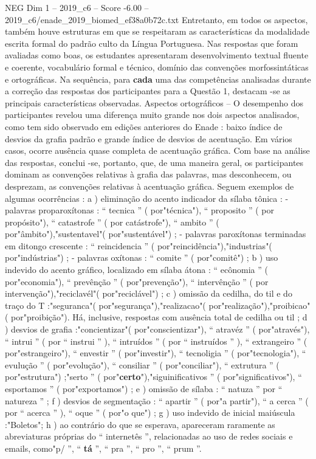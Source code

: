 \begin{textsample}{NEG Dim 1 – 2019\_c6 – Score -6.00 – 2019\_c6/enade\_2019\_biomed\_ef38a0b72c.txt}
Entretanto, em todos os aspectos, também houve estruturas em que se respeitaram as características da modalidade escrita formal do padrão culto da Língua Portuguesa.
Nas respostas que foram avaliadas como boas, os estudantes apresentaram desenvolvimento textual fluente e coerente, vocabulário formal e técnico, domínio das convenções morfossintáticas e ortográficas.
Na sequência, para \textbf{cada} uma das competências analisadas durante a correção das respostas dos participantes para a Questão 1, destacam -se as principais características observadas.
Aspectos ortográficos – O desempenho dos participantes revelou uma diferença muito grande nos dois aspectos analisados, como tem sido observado em edições anteriores do Enade : baixo índice de desvios da grafia padrão e grande índice de desvios de acentuação.
Em vários casos, ocorre ausência quase completa de acentuação gráfica.
Com base na análise das respostas, conclui -se, portanto, que, de uma maneira geral, os participantes dominam as convenções relativas à grafia das palavras, mas desconhecem, ou desprezam, as convenções relativas à acentuação gráfica.
Seguem exemplos de algumas ocorrências : a ) eliminação do acento indicador da sílaba tônica : - palavras proparoxítonas : “ tecnica ” ( por"técnica"), “ proposito ” ( por propósito"), “ catastrofe ” ( por catástrofe"), “ ambito ” ( por"âmbito"),"sustentavel"( por"sustentável") ; - palavras paroxítonas terminadas em ditongo crescente : “ reincidencia ” ( por"reincidência"),"industrias"( por"indústrias") ; - palavras oxítonas : “ comite ” ( por"comitê") ; b ) uso indevido do acento gráfico, localizado em sílaba átona : “ ecônomia ” ( por"economia"), “ prevênção ” ( por"prevenção"), “ intervênção ” ( por intervenção"),"reciclavél"( por"reciclável") ; c ) omissão da cedilha, do til e do traço do T :"seguranca"( por"segurança"),"realizacao"( por"realização"),"proibicao"( por"proibição").
Há, inclusive, respostas com ausência total de cedilha ou til ; d ) desvios de grafia :"concientizar"( por"conscientizar"), “ atravéz ” ( por"através"), “ intrui ” ( por “ instrui ” ), “ intruídos ” ( por “ instruídos ” ), “ extrangeiro ” ( por"estrangeiro"), “ envestir ” ( por"investir"), “ tecnoligia ” ( por"tecnologia"), “ evulução ” ( por"evolução"), “ consiliar ” ( por"conciliar"), “ extrutura ” ( por"estrutura") ;"serto ” ( por"\textbf{certo}"),"siguinificativos ” ( por"significativos"), “ esportamos ” ( por"exportamos") ; e ) omissão de sílaba : “ natuza ” por “ natureza ” ; f ) desvios de segmentação : “ apartir ” ( por"a partir"), “ a cerca ” ( por “ acerca ” ), “ oque ” ( por"o que") ; g ) uso indevido de inicial maiúscula :"Boletos"; h ) ao contrário do que se esperava, apareceram raramente as abreviaturas próprias do “ internetês ”, relacionadas ao uso de redes sociais e emails, como"p/ ”, “ \textbf{tá} ”, “ pra ”, “ pro ”, “ prum ”.

\end{textsample}
